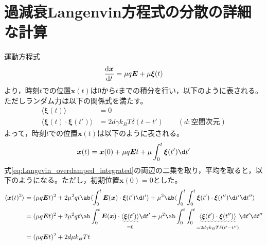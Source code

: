 \documentclass[autodetect-engine,dvi=dvipdfmx,a4paper,ja=standard,oneside,openany,11pt,draft]{bxjsbook}
\begin{document}
\section{過減衰Langenvin方程式の分散の詳細な計算}
\label{sec:Langevin_cal}
運動方程式
\begin{equation}
  \odv{\bm{x}}{t}=\mu q\bm{E}+\mu\bm{\xi}(t)
  \label{eq:Langevin_overdamped}
\end{equation}
より，時刻$t$での位置$\bm{x}(t)$は0から$t$までの積分を行い，以下のように表される。ただしランダム力は以下の関係式を満たす。
\begin{equation}
  \begin{split}
    \langle\bm{\xi}(t)\rangle                  & =0                                                   \\
    \langle\bm{\xi}(t)\cdot\bm{\xi}(t')\rangle & =2d\gamma k_B T\delta(t-t') \qquad (d:\mathrm{空間次元})
  \end{split}
  \label{eq:random_force}
\end{equation}
よって，時刻$t$での位置$\bm{x}(t)$は以下のように表される。
\begin{equation}
  \bm{x}(t)=\bm{x}(0)+\mu q\bm{E}t+\mu\int_0^t\bm{\xi}(t')\d t'
  \label{eq:Langevin_overdamped_integrated}
\end{equation}
式\ref{eq:Langevin_overdamped_integrated}の両辺の二乗を取り，平均を取ると，以下のようになる。ただし，初期位置$\bm{x}(0)=0$とした。
\begin{equation}
  \begin{split}
    \langle\bm{x}(t)^2\rangle & =(\mu q \bm{E} t)^2+2\mu^2 q t\ab\langle\int_{0}^{t}\bm{E}(\bm{x})\cdot\bm{\xi}(t') \d t'\rangle+\mu^2\ab\langle\int_{0}^{t}\int_{0}^{t}\bm{\xi}(t')\cdot
    \bm{\xi}(t'') \d t' \d t''\rangle                                                                                                                                                                                                                            \\
                              & =(\mu q \bm{E} t)^2+2\mu^2 q t\ab\int_{0}^{t}\bm{E}(\bm{x})\cdot\underset{=0}{\uwave{\langle\bm{\xi}(t')\rangle}} \d t'+\mu^2\ab\int_{0}^{t}\int_{0}^{t}\underset{=2d\gamma k_B T\delta(t'-t'')}{\uwave{\langle\bm{\xi}(t')\cdot
    \bm{\xi}(t'')\rangle}} \d t' \d t''                                                                                                                                                                                                                          \\
                              & =(\mu q \bm{E} t)^2+2d\mu k_B T t                                                                                                                                                                                                \\
  \end{split}
  \label{eq:Langevin_overdamped_variance}
\end{equation}
\end{document}
